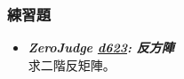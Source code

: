 \subsubsection*{練習題}
\begin{itemize}[label={\Checkmark}]
\item \textbf{\textit{ZeroJudge \href{http://zerojudge.tw/ShowProblem?problemid=d623}{d623}: 反方陣}}\\
求二階反矩陣。
\end{itemize}